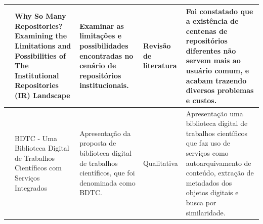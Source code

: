 \begin{landscape}
\begin{table}[H]
{\begin{tabular}{|p{5cm}|p{12cm}|p{12cm}|p{4cm}|p{13cm}|}
                \cite{2018:Arlitsch}         & Why So Many Repositories? Examining the Limitations and Possibilities of The Institutional Repositories (IR) Landscape                    & Examinar as limitações e possibilidades encontradas no cenário de repositórios institucionais.                                                              & Revisão de literatura               & Foi constatado que a existência de centenas de repositórios diferentes não servem mais ao usuário comum, e acabam trazendo diversos problemas e custos.                                      \\ \hline
                \cite{2009:Cervi}            & BDTC - Uma Biblioteca Digital de Trabalhos Científicos com Serviços Integrados                                                            & Apresentação da proposta de biblioteca digital de trabalhos científicos, que foi denominada como BDTC.                                                      & Qualitativa                         & Apresentação uma biblioteca digital de trabalhos científicos que faz uso de serviços como autoarquivamento de conteúdo, extração de metadados dos objetos digitais e busca por similaridade. \\ \hline
            \end{tabular}%
        }
    \end{table}
\end{landscape}
